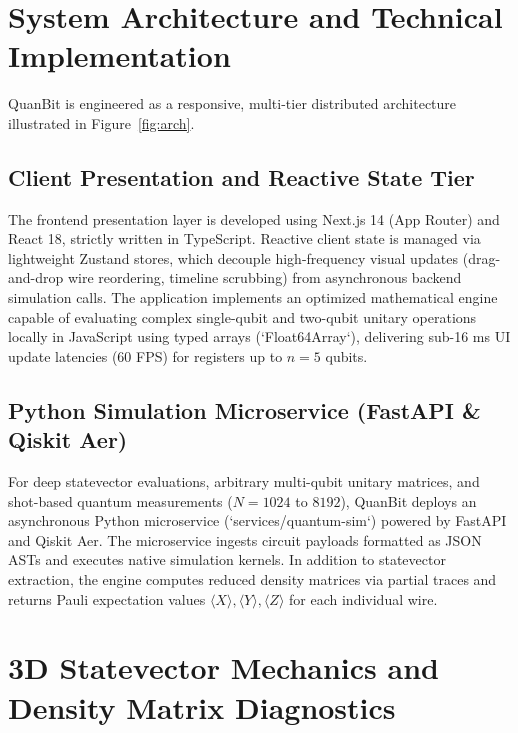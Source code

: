 \documentclass[conference]{IEEEtran}
\begin{document}
\section{System Architecture and Technical Implementation}
\label{sec:arch_impl}

QuanBit is engineered as a responsive, multi-tier distributed architecture illustrated in Figure~\ref{fig:arch}.

\subsection{Client Presentation and Reactive State Tier}
The frontend presentation layer is developed using Next.js 14 (App Router) and React 18, strictly written in TypeScript. Reactive client state is managed via lightweight Zustand stores, which decouple high-frequency visual updates (drag-and-drop wire reordering, timeline scrubbing) from asynchronous backend simulation calls. The application implements an optimized mathematical engine capable of evaluating complex single-qubit and two-qubit unitary operations locally in JavaScript using typed arrays (`Float64Array`), delivering sub-16 ms UI update latencies (60 FPS) for registers up to $n=5$ qubits.

\subsection{Python Simulation Microservice (FastAPI \& Qiskit Aer)}
For deep statevector evaluations, arbitrary multi-qubit unitary matrices, and shot-based quantum measurements ($N=1024$ to $8192$), QuanBit deploys an asynchronous Python microservice (`services/quantum-sim`) powered by FastAPI and Qiskit Aer. The microservice ingests circuit payloads formatted as JSON ASTs and executes native simulation kernels. In addition to statevector extraction, the engine computes reduced density matrices via partial traces and returns Pauli expectation values $\langle X \rangle, \langle Y \rangle, \langle Z \rangle$ for each individual wire.

\section{3D Statevector Mechanics and Density Matrix Diagnostics}
\label{sec:bloch_mechanics}
\end{document}

